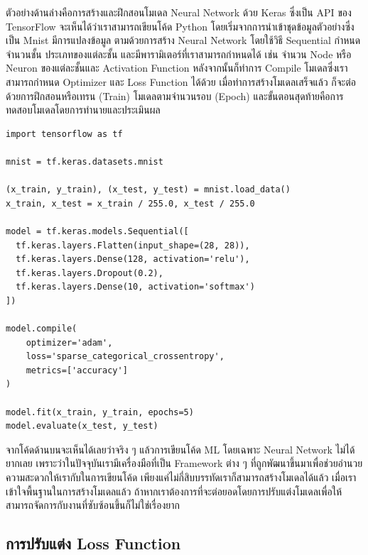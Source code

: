 ตัวอย่างด้านล่างคือการสร้างและฝึกสอนโมเดล Neural Network ด้วย Keras ซึ่งเป็น API ของ TensorFlow จะเห็นได้ว่าเราสามารถเขียนโค้ด 
Python โดยเริ่มจากการนำเข้าชุดข้อมูลตัวอย่างซึ่งเป็น Mnist มีการแปลงข้อมูล ตามด้วยการสร้าง Neural Network โดยใช้วิธี Sequential 
กำหนดจำนวนชั้น ประเภทของแต่ละชั้น และมีพารามิเตอร์ที่เราสามารถกำหนดได้ เช่น จำนวน Node หรือ Neuron ของแต่ละชั้นและ Activation 
Function หลังจากนั้นก็ทำการ Compile โมเดลซึ่งเราสามารถกำหนด Optimizer และ Loss Function ได้ด้วย เมื่อทำการสร้างโมเดลเสร็จแล้ว 
ก็จะต่อด้วยการฝึกสอนหรือเทรน (Train) โมเดลตามจำนวนรอบ (Epoch) และขั้นตอนสุดท้ายคือการทดสอบโมเดลโดยการทำนายและประเมินผล

\begin{lstlisting}[style=MyPython]
import tensorflow as tf

mnist = tf.keras.datasets.mnist

(x_train, y_train), (x_test, y_test) = mnist.load_data()
x_train, x_test = x_train / 255.0, x_test / 255.0

model = tf.keras.models.Sequential([
  tf.keras.layers.Flatten(input_shape=(28, 28)),
  tf.keras.layers.Dense(128, activation='relu'),
  tf.keras.layers.Dropout(0.2),
  tf.keras.layers.Dense(10, activation='softmax')
])

model.compile(
    optimizer='adam',
    loss='sparse_categorical_crossentropy',
    metrics=['accuracy']
)

model.fit(x_train, y_train, epochs=5)
model.evaluate(x_test, y_test)
\end{lstlisting}

จากโค้ดด้านบนจะเห็นได้เลยว่าจริง ๆ แล้วการเขียนโค้ด ML โดยเฉพาะ Neural Network ไม่ได้ยากเลย เพราะว่าในปัจจุบันเรามีเครื่องมือที่เป็น 
Framework ต่าง ๆ ที่ถูกพัฒนาขึ้นมาเพื่อช่วยอำนวยความสะดวกให้เรากับในการเขียนโค้ด เพียงแค่ไม่กี่สิบบรรทัดเราก็สามารถสร้างโมเดลได้แล้ว
เมื่อเราเข้าใจพื้นฐานในการสร้างโมเดลแล้ว ถ้าหากเราต้องการที่จะต่อยอดโดยการปรับแต่งโมเดลเพื่อให้สามารถจัดการกับงานที่ซับซ้อนขึ้นก็ไม่ใช่เรื่องยาก

\subsection{การปรับแต่ง Loss Function}

